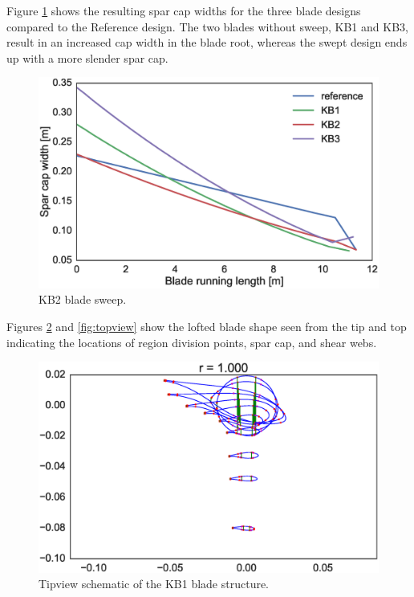 Figure \ref{fig:capwidth} shows the resulting spar cap widths for the three blade designs compared to the Reference design.
The two blades without sweep, KB1 and KB3, result in an increased cap width in the blade root, whereas the swept design ends up with a more slender spar cap.  

\begin{figure}[!ht]
\begin{center}
	\includegraphics[width=.85\linewidth]{figures/KB_spar_cap_width.eps}
\end{center}
\caption{KB2 blade sweep.}
\label{fig:capwidth}
\end{figure}

Figures \ref{fig:tipview} and \ref{fig:topview} show the lofted blade shape seen from the tip and top indicating the locations of region division points, spar cap, and shear webs.

\begin{figure}[!ht]
\begin{center}
	\includegraphics[width=.85\linewidth]{figures/KB1_tipview.eps}
\end{center}
\caption{Tipview schematic of the KB1 blade structure.}
\label{fig:tipview}
\end{figure}

